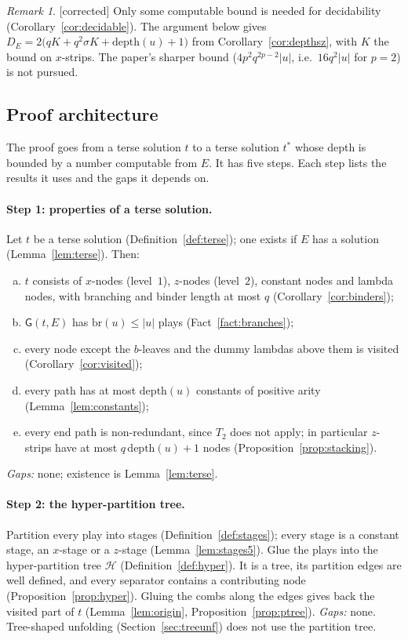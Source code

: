 \documentclass[11pt]{article}
\newcommand{\depth}{\mathrm{depth}}
\newcommand{\br}{\mathrm{br}}
\newcommand{\Gm}{\mathsf{G}}
\newcommand{\Fixed}{\textsf{[corrected]}}
\theoremstyle{plain}
\theoremstyle{definition}
\theoremstyle{remark}
\newtheorem{remark}[theorem]{Remark}
\begin{document}
\begin{remark}
\Fixed{} Only some computable bound is needed for decidability
(Corollary~\ref{cor:decidable}).  The argument below gives
$D_E=2\bigl(qK+q^2\sigma K+\depth(u)+1\bigr)$ from
Corollary~\ref{cor:depthsz}, with $K$ the bound on $x$-strips.  The
paper's sharper bound ($4p^2q^{2p-2}|u|$, i.e.\ $16q^2|u|$ for $p=2$) is
not pursued.
\end{remark}

\subsection{Proof architecture}\label{sec:architecture}

The proof goes from a terse solution $t$ to a terse solution $t^*$ whose
depth is bounded by a number computable from $E$.  It has five steps.
Each step lists the results it uses and the gaps it depends on.

\paragraph{Step 1: properties of a terse solution.}
Let $t$ be a terse solution (Definition~\ref{def:terse}); one exists if
$E$ has a solution (Lemma~\ref{lem:terse}).  Then:
\begin{enumerate}[(a)]
\item $t$ consists of $x$-nodes (level~$1$), $z$-nodes (level~$2$),
  constant nodes and lambda nodes, with branching and binder length at
  most $q$ (Corollary~\ref{cor:binders});
\item $\Gm(t,E)$ has $\br(u)\le|u|$ plays (Fact~\ref{fact:branches});
\item every node except the $b$-leaves and the dummy lambdas above them
  is visited (Corollary~\ref{cor:visited});
\item every path has at most $\depth(u)$ constants of positive arity
  (Lemma~\ref{lem:constants});
\item every end path is non-redundant, since $T_2$ does not apply; in
  particular $z$-strips have at most $q\,\depth(u)+1$ nodes
  (Proposition~\ref{prop:stacking}).
\end{enumerate}
\emph{Gaps:} none; existence is Lemma~\ref{lem:terse}.

\paragraph{Step 2: the hyper-partition tree.}
Partition every play into stages (Definition~\ref{def:stages}); every
stage is a constant stage, an $x$-stage or a $z$-stage
(Lemma~\ref{lem:stages5}).  Glue the plays into the hyper-partition tree
$\mathcal H$ (Definition~\ref{def:hyper}).  It is a tree, its partition
edges are well defined, and every separator contains a contributing
node (Proposition~\ref{prop:hyper}).  Gluing the combs along the edges
gives back the visited part of $t$ (Lemma~\ref{lem:origin},
Proposition~\ref{prop:ptree}).
\emph{Gaps:} none.  Tree-shaped unfolding
(Section~\ref{sec:treeunf}) does not use the partition tree.
\end{document}
